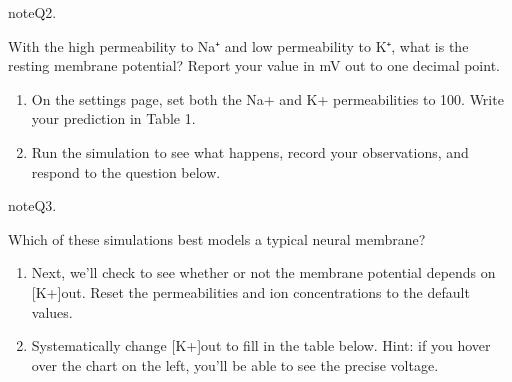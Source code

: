 \documentclass[letterpaper,10pt,english]{jupyterBook}
\begin{document}
\begin{sphinxadmonition}{note}{Q2.}

\sphinxAtStartPar
With the high permeability to Na⁺ and low permeability to K⁺, what is the resting membrane potential? Report your value in mV out to one decimal point.
\end{sphinxadmonition}
\begin{enumerate}
%
\setcounter{enumi}{15}
\item {} 
\sphinxAtStartPar
On the settings page, set both the Na+ and K+ permeabilities to 100. Write your prediction in Table 1.

\item {} 
\sphinxAtStartPar
Run the simulation to see what happens, record your observations, and respond to the question below. 

\end{enumerate}

\begin{sphinxadmonition}{note}{Q3.}

\sphinxAtStartPar
Which of these simulations best models a typical neural membrane?
\end{sphinxadmonition}
\begin{enumerate}
%
\setcounter{enumi}{17}
\item {} 
\sphinxAtStartPar
Next, we’ll check to see whether or not the membrane potential depends on {[}K+{]}out. Reset the permeabilities and ion concentrations to the default values.

\item {} 
\sphinxAtStartPar
Systematically change {[}K+{]}out to fill in the table below. Hint: if you hover over the chart on the left, you’ll be able to see the precise voltage. 

\end{enumerate}

\sphinxAtStartPar
{}
\end{document}
